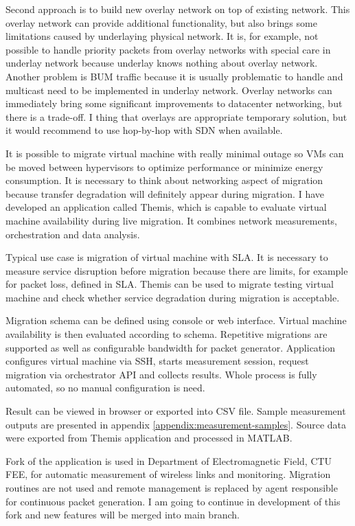 Second approach is to build new overlay network on top of existing network. This overlay network can provide additional functionality, but also brings some limitations caused by underlaying physical network. It is, for example, not possible to handle priority packets from overlay networks with special care in underlay network because underlay knows nothing about overlay network. Another problem is \Ac{BUM} traffic because it is usually problematic to handle and multicast need to be implemented in underlay network.
Overlay networks can immediately bring some significant improvements to datacenter networking, but there is a trade-off. I thing that overlays are appropriate temporary solution, but it would recommend to use hop-by-hop with \Ac{SDN} when available.

It is possible to migrate virtual machine with really minimal outage so \Ac{VM}s can be moved between hypervisors to optimize performance or minimize energy consumption. It is necessary to think about networking aspect of migration because transfer degradation will definitely appear during migration. I have developed an application called Themis, which is capable to evaluate virtual machine availability during live migration. It combines network measurements, orchestration and data analysis.

Typical use case is migration of virtual machine with \Ac{SLA}. It is necessary to measure service disruption before migration because there are limits, for example for packet loss, defined in \Ac{SLA}. Themis can be used to migrate testing virtual machine and check whether service degradation during migration is acceptable.

Migration schema can be defined using console or web interface. Virtual machine availability is then evaluated according to schema. Repetitive migrations are supported as well as configurable bandwidth for packet generator. 
Application configures virtual machine via \Ac{SSH}, starts measurement session, request migration via orchestrator \Ac{API} and collects results. Whole process is fully automated, so no manual configuration is need. 

Result can be viewed in browser or exported into \Ac{CSV} file. Sample measurement outputs are presented in appendix \ref{appendix:measurement-samples}. Source data were exported from Themis application and processed in MATLAB.

Fork of the application is used in Department of Electromagnetic Field, CTU FEE, for automatic measurement of wireless links and monitoring. Migration routines are not used and remote management is replaced by agent responsible for continuous packet generation. I am going to continue in development of this fork and new features will be merged into main branch.

